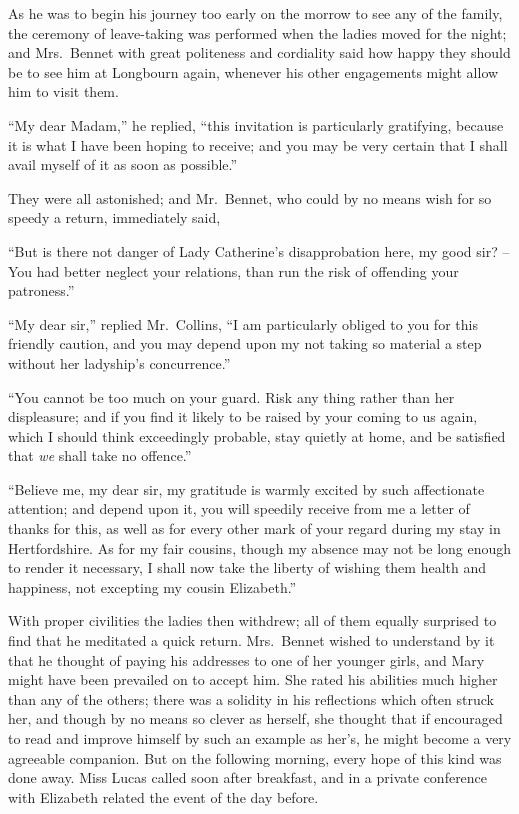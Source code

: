 As he was to begin his journey too early on the morrow
to see any of the family, the ceremony of leave-taking
was performed when the ladies moved for the night; and
Mrs.\ Bennet with great politeness and cordiality said how
happy they should be to see him at Longbourn again, whenever
his other engagements might allow him to visit them.

“My dear Madam,” he replied, “this invitation is
particularly gratifying, because it is what I have been
hoping to receive; and you may be very certain that I
shall avail myself of it as soon as possible.”

They were all astonished; and Mr.\ Bennet, who could
by no means wish for so speedy a return, immediately said,

“But is there not danger of Lady Catherine’s disapprobation
here, my good sir? -- You had better neglect your
relations, than run the risk of offending your patroness.”

“My dear sir,” replied Mr.\ Collins, “I am particularly
obliged to you for this friendly caution, and you may
depend upon my not taking so material a step without her
ladyship’s concurrence.”

“You cannot be too much on your guard. Risk
any thing rather than her displeasure; and if you find it
likely to be raised by your coming to us again, which I
should think exceedingly probable, stay quietly at home,
and be satisfied that \textit{we} shall take no offence.”

“Believe me, my dear sir, my gratitude is warmly
excited by such affectionate attention; and depend upon
it, you will speedily receive from me a letter of thanks for
this, as well as for every other mark of your regard during
my stay in Hertfordshire. As for my fair cousins, though
my absence may not be long enough to render it necessary,
I shall now take the liberty of wishing them health and
happiness, not excepting my cousin Elizabeth.”

With proper civilities the ladies then withdrew; all of
them equally surprised to find that he meditated a quick
return. Mrs.\ Bennet wished to understand by it that he
thought of paying his addresses to one of her younger
girls, and Mary might have been prevailed on to accept
him. She rated his abilities much higher than any of the
others; there was a solidity in his reflections which often
struck her, and though by no means so clever as herself,
she thought that if encouraged to read and improve himself
by such an example as her’s, he might become a very
agreeable companion. But on the following morning,
every hope of this kind was done away. Miss Lucas called
soon after breakfast, and in a private conference with
Elizabeth related the event of the day before.


